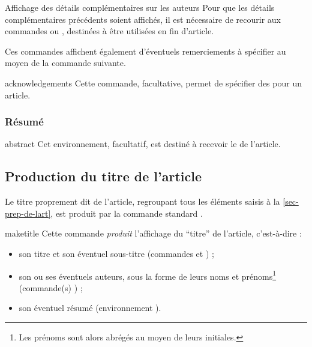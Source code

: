 \begin{dbremark}{Affichage des détails complémentaires sur les auteurs}{}
  Pour que les détails complémentaires précédents soient affichés, il est
  nécessaire de recourir aux commandes  ou
  , destinées à être utilisées en fin d'article.

  Ces commandes affichent également d'éventuels remerciements à spécifier au
  moyen de la commande  suivante.
\end{dbremark}

\begin{docCommand}{acknowledgements}{}
  Cette commande, facultative, permet de spécifier des  pour
  un article.
\begin{bodycode}
\end{bodycode}
\end{docCommand}

\subsubsection{Résumé}
\label{sec-resume}

\begin{docEnvironment}[doclang/environment content=résumé]{abstract}{}
  Cet environnement, facultatif, est destiné à recevoir le  de
  l'article.
\end{docEnvironment}

\subsection{Production du titre de l'article}
\label{sec-creation-du-titre}

Le titre proprement dit de l'article, regroupant tous les éléments saisis à la
\vref{sec-prep-de-lart}, est produit par la commande standard
.

\begin{docCommand}[doc description=\mandatory]{maketitle}{}
  Cette commande \emph{produit} l'affichage du \enquote{titre} de l'article,
  c'est-à-dire :
  \begin{itemize}
  \item son titre et son éventuel sous-titre (commandes  et
    ) ;
  \item son ou ses éventuels auteurs, sous la forme de leurs noms et
    prénoms\footnote{Les prénoms sont alors abrégés au moyen de leurs
      initiales.} (commande(s) ) ;
  \item son éventuel résumé (environnement ).
  \end{itemize}
\end{docCommand}

